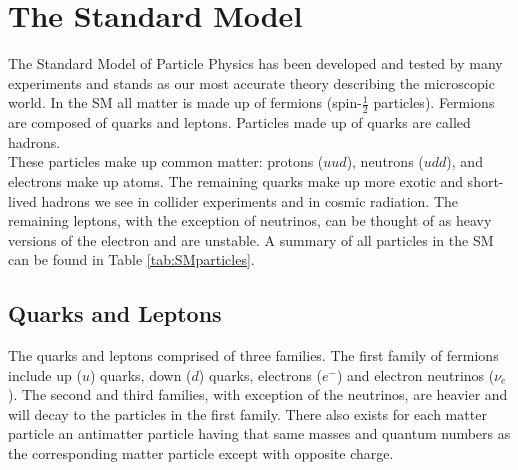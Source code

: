 

\section{The Standard Model}

The Standard Model of Particle Physics has been developed and tested by many experiments and stands as our most accurate theory describing the microscopic world.  In the SM all matter is made up of fermions (spin-$\frac{1}{2} $ particles).  Fermions are composed of quarks and leptons.  Particles made up of quarks are called hadrons.\\%

These particles make up common matter: protons ($uud$), neutrons ($udd$), and electrons make up atoms.  The remaining quarks make up more exotic and short-lived hadrons we see in collider experiments and in cosmic radiation.  The remaining leptons, with the exception of neutrinos, can be thought of as heavy versions of the electron and are unstable.  A summary of all particles in the SM can be found in Table \ref{tab:SMparticles}. \\



\subsection{Quarks and Leptons}

The quarks and leptons comprised of three families.  The first family of fermions include up ($u$) quarks, down ($d$) quarks, electrons ($e^{-}$) and electron neutrinos ($\nu_{e}$).  The second and third families, with exception of the neutrinos, are heavier and will decay to the particles in the first family.  There also exists for each matter particle an antimatter particle having that same masses and quantum numbers as the corresponding matter particle except with opposite charge.  \\

